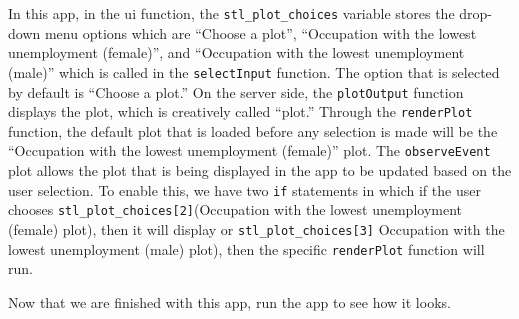 \documentclass[
  krantz2]{krantz}
\makeatletter
\newenvironment{Shaded}{\begin{snugshade}}{\end{snugshade}}
\newcommand{\AttributeTok}[1]{\textcolor[rgb]{0.61,0.61,0.61}{#1}}
\newcommand{\CommentTok}[1]{\textcolor[rgb]{0.37,0.37,0.37}{\textit{#1}}}
\newcommand{\ControlFlowTok}[1]{\textcolor[rgb]{0.27,0.27,0.27}{\textbf{#1}}}
\newcommand{\DecValTok}[1]{\textcolor[rgb]{0.06,0.06,0.06}{#1}}
\newcommand{\FunctionTok}[1]{\textcolor[rgb]{0,0,0}{#1}}
\newcommand{\NormalTok}[1]{#1}
\newcommand{\OtherTok}[1]{\textcolor[rgb]{0.37,0.37,0.37}{#1}}
\newcommand{\SpecialCharTok}[1]{\textcolor[rgb]{0,0,0}{#1}}
\newcommand{\StringTok}[1]{\textcolor[rgb]{0.5,0.5,0.5}{#1}}
\newenvironment{kframe}{%
\medskip{}
\setlength{\fboxsep}{.8em}
 \def\at@end@of@kframe{}%
 \ifinner\ifhmode%
  \def\at@end@of@kframe{\end{minipage}}%
  \begin{minipage}{\columnwidth}%
 \fi\fi%
 \def\FrameCommand##1{\hskip\@totalleftmargin \hskip-\fboxsep
 \colorbox{shadecolor}{##1}\hskip-\fboxsep
     \hskip-\linewidth \hskip-\@totalleftmargin \hskip\columnwidth}%
 \MakeFramed {\advance\hsize-\width
   \@totalleftmargin\z@ \linewidth\hsize
   \@setminipage}}%
 {\par\unskip\endMakeFramed%
 \at@end@of@kframe}
\renewenvironment{Shaded}{\begin{kframe}}{\end{kframe}}
\makeatother
\begin{document}
\begin{Shaded}
\end{Shaded}

In this app, in the ui function, the \texttt{stl\_plot\_choices} variable stores the drop-down menu options which are ``Choose a plot'', ``Occupation with the lowest unemployment (female)'', and ``Occupation with the lowest unemployment (male)'' which is called in the \texttt{selectInput} function. The option that is selected by default is ``Choose a plot.'' On the server side, the \texttt{plotOutput} function displays the plot, which is creatively called ``plot.'' Through the \texttt{renderPlot} function, the default plot that is loaded before any selection is made will be the ``Occupation with the lowest unemployment (female)'' plot. The \texttt{observeEvent} plot allows the plot that is being displayed in the app to be updated based on the user selection. To enable this, we have two \texttt{if} statements in which if the user chooses \texttt{stl\_plot\_choices{[}2{]}}(Occupation with the lowest unemployment (female) plot), then it will display or \texttt{stl\_plot\_choices{[}3{]}} Occupation with the lowest unemployment (male) plot), then the specific \texttt{renderPlot} function will run.

Now that we are finished with this app, run the app to see how it looks.
\end{document}
